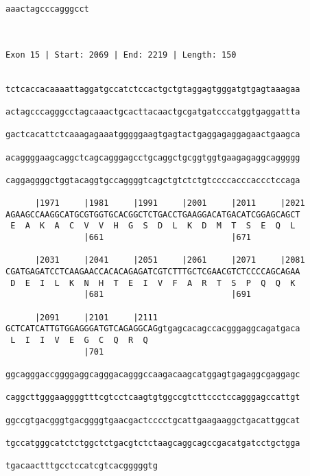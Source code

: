 \documentclass{article}
\begin{document}
\begin{Verbatim}
aaactagcccagggcct
                 
                 
 
Exon 15 | Start: 2069 | End: 2219 | Length: 150


tctcaccacaaaattaggatgccatctccactgctgtaggagtgggatgtgagtaaagaa
                                                            
actagcccagggcctagcaaactgcacttacaactgcgatgatcccatggtgaggattta
                                                            
gactcacattctcaaagagaaatgggggaagtgagtactgaggagaggagaactgaagca
                                                            
acaggggaagcaggctcagcagggagcctgcaggctgcggtggtgaagagaggcaggggg
                                                            
caggaggggctggtacaggtgccaggggtcagctgtctctgtccccacccaccctccaga
                                                            
      |1971     |1981     |1991     |2001     |2011     |2021
AGAAGCCAAGGCATGCGTGGTGCACGGCTCTGACCTGAAGGACATGACATCGGAGCAGCT
 E  A  K  A  C  V  V  H  G  S  D  L  K  D  M  T  S  E  Q  L 
                |661                          |671          
  
      |2031     |2041     |2051     |2061     |2071     |2081
CGATGAGATCCTCAAGAACCACACAGAGATCGTCTTTGCTCGAACGTCTCCCCAGCAGAA
 D  E  I  L  K  N  H  T  E  I  V  F  A  R  T  S  P  Q  Q  K 
                |681                          |691          
  
      |2091     |2101     |2111                             
GCTCATCATTGTGGAGGGATGTCAGAGGCAGgtgagcacagccacgggaggcagatgaca
 L  I  I  V  E  G  C  Q  R  Q                               
                |701                                        
  
ggcagggaccggggaggcagggacagggccaagacaagcatggagtgagaggcgaggagc
                                                            
caggcttgggaaggggtttcgtcctcaagtgtggccgtcttccctccagggagccattgt
                                                            
ggccgtgacgggtgacggggtgaacgactcccctgcattgaagaaggctgacattggcat
                                                            
tgccatgggcatctctggctctgacgtctctaagcaggcagccgacatgatcctgctgga
                                                            
tgacaactttgcctccatcgtcacgggggtg
                               

\end{Verbatim}
\end{document}
